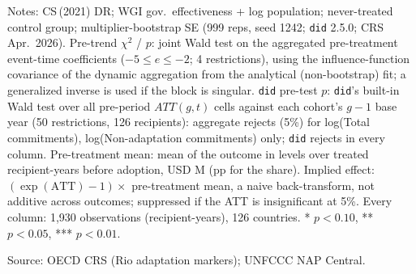 \begin{table}[H]
\centering
\caption{Effect of NAP adoption on climate finance: simple ATT across outcomes (cohorts $\geq 5$ units, DR + multiplier-bootstrap SE)}
\label{tab:combined_wide_main}
\begingroup\small
{}
\endgroup
\par\vspace{4pt}
\begin{minipage}{\linewidth}\footnotesize
Notes: CS\,(2021) DR; WGI gov.\ effectiveness + log population; never-treated control group; multiplier-bootstrap SE (999 reps, seed 1242; \texttt{did} 2.5.0; CRS Apr.\ 2026). Pre-trend $\chi^2$ / $p$: joint Wald test on the aggregated pre-treatment event-time coefficients ($-5 \leq e \leq -2$; 4 restrictions), using the influence-function covariance of the dynamic aggregation from the analytical (non-bootstrap) fit; a generalized inverse is used if the block is singular. \texttt{did} pre-test $p$: \texttt{did}'s built-in Wald test over all pre-period $ATT(g,t)$ cells against each cohort's $g-1$ base year (50 restrictions, 126 recipients): aggregate rejects (5\%) for log(Total commitments), log(Non-adaptation commitments) only; \texttt{did} rejects in every column. Pre-treatment mean: mean of the outcome in levels over treated recipient-years before adoption, USD M (pp for the share). Implied effect: $(\exp(\mathrm{ATT})-1) \times$ pre-treatment mean, a naive back-transform, not additive across outcomes; suppressed if the ATT is insignificant at 5\%. Every column: 1,930 observations (recipient-years), 126 countries. * $p<0.10$, ** $p<0.05$, *** $p<0.01$.\par
Source: OECD CRS (Rio adaptation markers); UNFCCC NAP Central.
\end{minipage}
\end{table}

